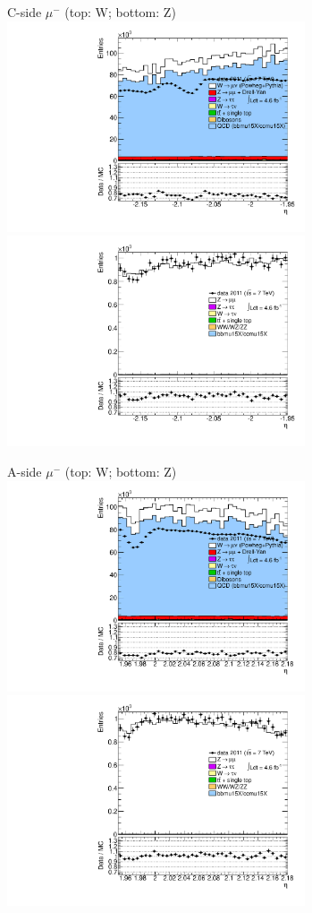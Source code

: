 {{
C-side $\mu^{-}$ (top: W; bottom: Z)
\centering
\includegraphics[width=0.66\textwidth]{dates/20130306/figures/etaphi/Wnocuts_10_C_stack_l_eta_NEG} \\
\includegraphics[width=0.66\textwidth]{dates/20130306/figures/etaphi/Z_10_C_stack_lN_eta_ALL.pdf}

A-side $\mu^{-}$ (top: W; bottom: Z)
\centering
\includegraphics[width=0.66\textwidth]{dates/20130306/figures/etaphi/Wnocuts_10_A_stack_l_eta_NEG} \\
\includegraphics[width=0.66\textwidth]{dates/20130306/figures/etaphi/Z_10_A_stack_lN_eta_ALL.pdf} 

}}
